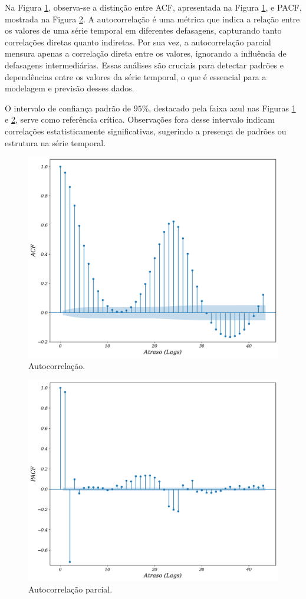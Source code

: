 Na Figura \ref{fig:acfa}, observa-se a distinção entre ACF, apresentada na Figura \ref{fig:acfa}, e PACF, mostrada na Figura \ref{fig:pacf}. A autocorrelação é uma métrica que indica a relação entre os valores de uma série temporal em diferentes defasagens, capturando tanto correlações diretas quanto indiretas. Por sua vez, a autocorrelação parcial mensura apenas a correlação direta entre os valores, ignorando a influência de defasagens intermediárias. Essas análises são cruciais para detectar padrões e dependências entre os valores da série temporal, o que é essencial para a modelagem e previsão desses dados.

O intervalo de confiança padrão de $95\%$, destacado pela faixa azul nas Figuras \ref{fig:acfa} e \ref{fig:pacf}, serve como referência crítica. Observações fora desse intervalo indicam correlações estatisticamente significativas, sugerindo a presença de padrões ou estrutura na série temporal.


\begin{figure}[!htb]
	\centering
	\caption{Autocorrelação.}\label{fig:acfa}	\includegraphics[width=0.6\linewidth]{Resultados/Figuras/acf} 
\end{figure}

\begin{figure}[!htb]
	\centering
	\caption{Autocorrelação parcial.}\label{fig:pacf}	\includegraphics[width=0.6\linewidth]{Resultados/Figuras/pacf}
\end{figure}

